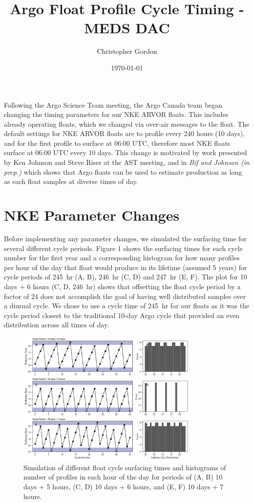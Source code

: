 \documentclass[11pt]{article}
\title{Argo Float Profile Cycle Timing - MEDS DAC}
\author{Christopher Gordon}
\date{\today}
\begin{document}
	\maketitle

    Following the Argo Science Team meeting, the Argo Canada team began changing the timing parameters for our NKE ARVOR floats. This includes already operating floats, which we changed via over-air messages to the float. The default settings for NKE ARVOR floats are to profile every 240 hours (10 days), and for the first profile to surface at 06:00 UTC, therefore most NKE floats surface at 06:00 UTC every 10 days. This change is motivated by work presented by Ken Johnson and Steve Riser at the AST meeting, and in \emph{Bif and Johnson (in prep.)} which shows that Argo floats can be used to estimate production as long as each float samples at diverse times of day. 

    \section{NKE Parameter Changes}

    Before implementing any parameter changes, we simulated the surfacing time for several different cycle periods. Figure 1 shows the surfacing times for each cycle number for the first year and a corresponding histogram for how many profiles per hour of the day that float would produce in its lifetime (assumed 5 years) for cycle periods of 245~hr (A, B), 246~hr (C, D) and 247~hr (E, F). The plot for 10 days + 6 hours (C, D, 246~hr) shows that offsetting the float cycle period by a factor of 24 does not accomplish the goal of having well distributed samples over a diurnal cycle. We chose to use a cycle time of 245~hr for our floats as it was the cycle period closest to the traditional 10-day Argo cycle that provided an even distribution across all times of day. 

    \begin{figure}[ht]
        \centering
        \includegraphics[width=0.8\textwidth]{../figures/profile_time_of_day_1yr_updated.png}
        \caption{Simulation of different float cycle surfacing times and histograms of number of profiles in each hour of the day for periods of (A, B) 10 days + 5 hours, (C, D) 10 days + 6 hours, and (E, F) 10 days + 7 hours.}
    \end{figure}
\end{document}
